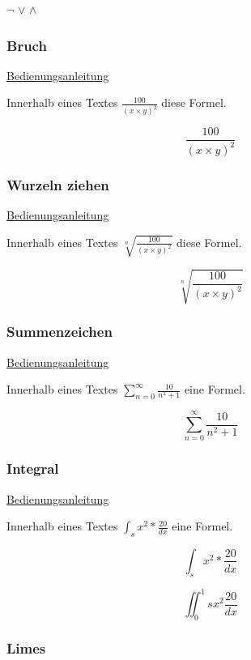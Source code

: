 $\neg$ 
$\lor$
$\land$

\newpage

\subsubsection{Bruch}

\href{http://namsu.de/Extra/befehle/Bruch.pdf}{Bedienungsanleitung}

Innerhalb eines Textes $\frac{100}{(x \times y)^2}$ diese Formel.

\[{\frac{100}{(x \times y)^2}}\]

\subsubsection{Wurzeln ziehen}

\href{https://www.namsu.de/Mathematik/1-6-2.html}{Bedienungsanleitung}

Innerhalb eines Textes $\sqrt[n]{\frac{100}{(x \times y)^2}}$ diese Formel.

\[\sqrt[n]{\frac{100}{(x \times y)^2}}\]

\subsubsection{Summenzeichen}

\href{https://de.overleaf.com/learn/latex/Integrals%2C_sums_and_limits}{Bedienungsanleitung}

Innerhalb eines Textes $\sum_{n=0}^{\infty}\frac{10}{n^2+1}$ eine Formel.

\[\sum_{n=0}^{\infty}\frac{10}{n^2+1}\]

\subsubsection{Integral}

\href{https://de.overleaf.com/learn/latex/Integrals%2C_sums_and_limits}{Bedienungsanleitung}

Innerhalb eines Textes $\int_sx^2*\frac{20}{dx}$ eine Formel.

\[\int_sx^2*\frac{20}{dx}\]

\[\iint_{0}^1sx^2\frac{20}{dx}\]

\newpage

\subsubsection{Limes}

